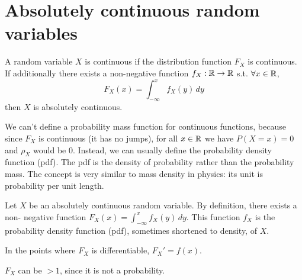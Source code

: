 \section{Absolutely continuous random variables}
\begin{definition}
    A random variable $X$ is continuous if the distribution function $F_X$ is continuous. If additionally there exists a non-negative function $f_X:\mathbb{R}\to\mathbb{R}$ s.t. $\forall x\in\mathbb{R}$,
    \begin{equation*}
        F_X(x)=\int_{-\infty}^{x} f_X(y) \,dy
    \end{equation*}
    then $X$ is absolutely continuous.
\end{definition}
We can't define a probability mass function for continuous functions, because since $F_X$ is continuous (it has no jumps), for all $x \in \mathbb{R}$ we have $P(X=x)=0$ and $\rho_X$ would be 0. Instead, we can usually define the probability density function (pdf). The pdf is the density of probability rather than the probability mass. The concept is very similar to mass density in physics: its unit is probability per unit length.
\begin{definition}
    Let $X$ be an absolutely continuous random variable. By definition, there exists a non- negative function $F_X(x)=\int_{-\infty}^{x} f_X(y) \,dy$. This function $f_X$ is the probability density function (pdf), sometimes shortened to density, of $X$.
\end{definition}
\begin{remark}
    In the points where $F_X$ is differentiable, $F_X'=f(x)$.
\end{remark}
\begin{remark}
    $F_X$ can be $>1$, since it is not a probability.
\end{remark}
